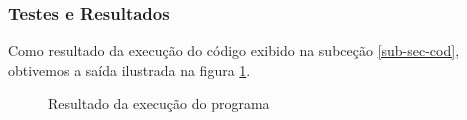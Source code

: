 \documentclass{article}
\begin{document}
\subsubsection{Testes e Resultados}
Como resultado da execução do código exibido na subceção \ref{sub-sec-cod}, obtivemos a saída ilustrada na figura \ref{fig:exec}. 

\begin{figure}[ht]
    \centering
    \caption{Resultado da execução do programa}
    \label{fig:exec}
\end{figure}

\printbibliography %
\end{document}
